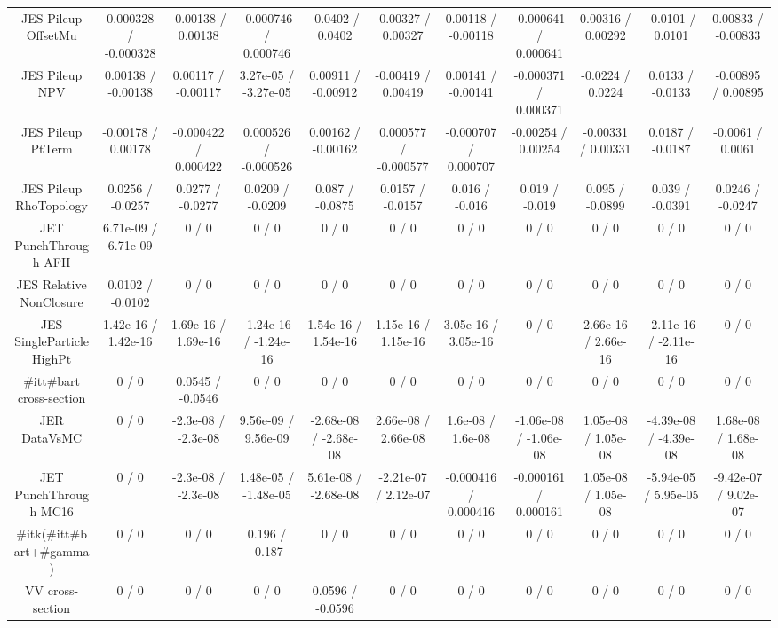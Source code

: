 \begin{table}[htbp]
\begin{center}
\begin{tabular}{|c|c|c|c|c|c|c|c|c|c|c|}
  JES Pileup OffsetMu & 0.000328 / -0.000328 & -0.00138 / 0.00138 & -0.000746 / 0.000746 & -0.0402 / 0.0402 & -0.00327 / 0.00327 & 0.00118 / -0.00118 & -0.000641 / 0.000641 & 0.00316 / 0.00292 & -0.0101 / 0.0101 & 0.00833 / -0.00833 \\ 
  JES Pileup NPV & 0.00138 / -0.00138 & 0.00117 / -0.00117 & 3.27e-05 / -3.27e-05 & 0.00911 / -0.00912 & -0.00419 / 0.00419 & 0.00141 / -0.00141 & -0.000371 / 0.000371 & -0.0224 / 0.0224 & 0.0133 / -0.0133 & -0.00895 / 0.00895 \\ 
  JES Pileup PtTerm & -0.00178 / 0.00178 & -0.000422 / 0.000422 & 0.000526 / -0.000526 & 0.00162 / -0.00162 & 0.000577 / -0.000577 & -0.000707 / 0.000707 & -0.00254 / 0.00254 & -0.00331 / 0.00331 & 0.0187 / -0.0187 & -0.0061 / 0.0061 \\ 
  JES Pileup RhoTopology & 0.0256 / -0.0257 & 0.0277 / -0.0277 & 0.0209 / -0.0209 & 0.087 / -0.0875 & 0.0157 / -0.0157 & 0.016 / -0.016 & 0.019 / -0.019 & 0.095 / -0.0899 & 0.039 / -0.0391 & 0.0246 / -0.0247 \\ 
  JET PunchThrough AFII & 6.71e-09 / 6.71e-09 & 0 / 0 & 0 / 0 & 0 / 0 & 0 / 0 & 0 / 0 & 0 / 0 & 0 / 0 & 0 / 0 & 0 / 0 \\ 
  JES Relative NonClosure & 0.0102 / -0.0102 & 0 / 0 & 0 / 0 & 0 / 0 & 0 / 0 & 0 / 0 & 0 / 0 & 0 / 0 & 0 / 0 & 0 / 0 \\ 
  JES SingleParticle HighPt & 1.42e-16 / 1.42e-16 & 1.69e-16 / 1.69e-16 & -1.24e-16 / -1.24e-16 & 1.54e-16 / 1.54e-16 & 1.15e-16 / 1.15e-16 & 3.05e-16 / 3.05e-16 & 0 / 0 & 2.66e-16 / 2.66e-16 & -2.11e-16 / -2.11e-16 & 0 / 0 \\ 
  #it{t#bar{t}} cross-section & 0 / 0 & 0.0545 / -0.0546 & 0 / 0 & 0 / 0 & 0 / 0 & 0 / 0 & 0 / 0 & 0 / 0 & 0 / 0 & 0 / 0 \\ 
  JER DataVsMC & 0 / 0 & -2.3e-08 / -2.3e-08 & 9.56e-09 / 9.56e-09 & -2.68e-08 / -2.68e-08 & 2.66e-08 / 2.66e-08 & 1.6e-08 / 1.6e-08 & -1.06e-08 / -1.06e-08 & 1.05e-08 / 1.05e-08 & -4.39e-08 / -4.39e-08 & 1.68e-08 / 1.68e-08 \\ 
  JET PunchThrough MC16 & 0 / 0 & -2.3e-08 / -2.3e-08 & 1.48e-05 / -1.48e-05 & 5.61e-08 / -2.68e-08 & -2.21e-07 / 2.12e-07 & -0.000416 / 0.000416 & -0.000161 / 0.000161 & 1.05e-08 / 1.05e-08 & -5.94e-05 / 5.95e-05 & -9.42e-07 / 9.02e-07 \\ 
  #it{k}(#it{t#bar{t}+#gamma}) & 0 / 0 & 0 / 0 & 0.196 / -0.187 & 0 / 0 & 0 / 0 & 0 / 0 & 0 / 0 & 0 / 0 & 0 / 0 & 0 / 0 \\ 
  VV cross-section & 0 / 0 & 0 / 0 & 0 / 0 & 0.0596 / -0.0596 & 0 / 0 & 0 / 0 & 0 / 0 & 0 / 0 & 0 / 0 & 0 / 0 \\ 

\end{tabular}
\end{center}
\end{table}
